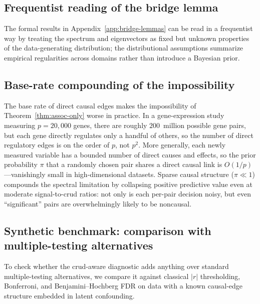 \subsection{Frequentist reading of the bridge lemma}
\label{si:frequentist}

The formal results in Appendix~\ref{app:bridge-lemmas} can be read in a frequentist way by treating the spectrum and eigenvectors as fixed but unknown properties of the data-generating distribution; the distributional assumptions summarize empirical regularities across domains rather than introduce a Bayesian prior.

\subsection{Base-rate compounding of the impossibility}
\label{si:base-rate}

The base rate of direct causal edges makes the impossibility of Theorem~\ref{thm:assoc-only} worse in practice. In a gene-expression study measuring $p=20{,}000$ genes, there are roughly $200$~million possible gene pairs, but each gene directly regulates only a handful of others, so the number of direct regulatory edges is on the order of $p$, not $p^2$. More generally, each newly measured variable has a bounded number of direct causes and effects, so the prior probability $\pi$ that a randomly chosen pair shares a direct causal link is $O(1/p)$---vanishingly small in high-dimensional datasets. Sparse causal structure ($\pi \ll 1$) compounds the spectral limitation by collapsing positive predictive value even at moderate signal-to-crud ratios: not only is each per-pair decision noisy, but even ``significant'' pairs are overwhelmingly likely to be noncausal.

\subsection{Synthetic benchmark: comparison with multiple-testing alternatives}
\label{si:synthetic-benchmark}

To check whether the crud-aware diagnostic adds anything over standard multiple-testing alternatives, we compare it against classical $|r|$ thresholding, Bonferroni, and Benjamini--Hochberg FDR \citep{benjamini_hochberg1995} on data with a known causal-edge structure embedded in latent confounding.

